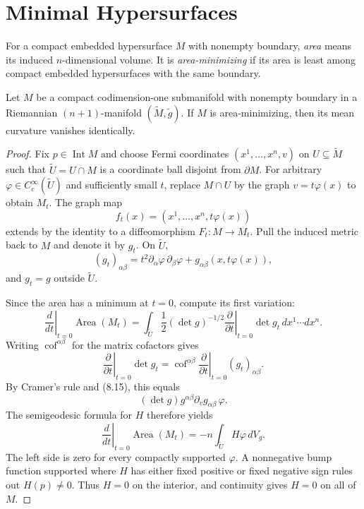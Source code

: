 \section{Minimal Hypersurfaces}

For a compact embedded hypersurface $M$ with nonempty boundary, \emph{area}
means its induced $n$-dimensional volume. It is \emph{area-minimizing} if its
area is least among compact embedded hypersurfaces with the same boundary.

\begin{theorem}
\label{thm:area-minimizing-zero-mean-curvature}

Let $M$ be a compact codimension-one submanifold with nonempty boundary in a
Riemannian $(n+1)$-manifold $(\widetilde M,\widetilde g)$. If $M$ is
area-minimizing, then its mean curvature vanishes identically.
\end{theorem}

\begin{proof}
\sketch Fix $p\in\operatorname{Int}M$ and choose Fermi coordinates
$(x^1,\ldots,x^n,v)$ on $U\subseteq\widetilde M$ such that
$\widetilde U=U\cap M$ is a coordinate ball disjoint from $\partial M$.
For arbitrary $\varphi\in C_c^\infty(\widetilde U)$ and sufficiently small
$t$, replace $M\cap U$ by the graph $v=t\varphi(x)$ to obtain $M_t$. The graph
map
\[
f_t(x)=(x^1,\ldots,x^n,t\varphi(x))
\]
extends by the identity to a diffeomorphism $F_t\colon M\to M_t$. Pull the
induced metric back to $M$ and denote it by $g_t$. On $\widetilde U$,
\begin{equation}
(g_t)_{\alpha\beta}
=t^2\partial_\alpha\varphi\,\partial_\beta\varphi
+g_{\alpha\beta}(x,t\varphi(x)), \tag{8.15}
\end{equation}
and $g_t=g$ outside $\widetilde U$.

Since the area has a minimum at $t=0$, compute its first variation:
\begin{equation}
\left.\frac d{dt}\right|_{t=0}\operatorname{Area}(M_t)
=\int_{\widetilde U}\frac12(\det g)^{-1/2}
 \left.\frac\partial{\partial t}\right|_{t=0}\det g_t
 \,dx^1\cdots dx^n. \tag{8.16}
\end{equation}
Writing $\operatorname{cof}^{\alpha\beta}$ for the matrix cofactors gives
\begin{equation}
\left.\frac\partial{\partial t}\right|_{t=0}\det g_t
=\operatorname{cof}^{\alpha\beta}
 \left.\frac\partial{\partial t}\right|_{t=0}(g_t)_{\alpha\beta}. \tag{8.17}
\end{equation}
By Cramer's rule and (8.15), this equals
\[
(\det g)g^{\alpha\beta}\partial_vg_{\alpha\beta}\,\varphi.
\]
The semigeodesic formula for $H$ therefore yields
\begin{equation}
\left.\frac d{dt}\right|_{t=0}\operatorname{Area}(M_t)
=-n\int_{\widetilde U}H\varphi\,dV_g. \tag{8.18}
\end{equation}
The left side is zero for every compactly supported $\varphi$. A nonnegative
bump function supported where $H$ has either fixed positive or fixed negative
sign rules out $H(p)\ne0$. Thus $H=0$ on the interior, and continuity gives
$H=0$ on all of $M$.
\end{proof}

